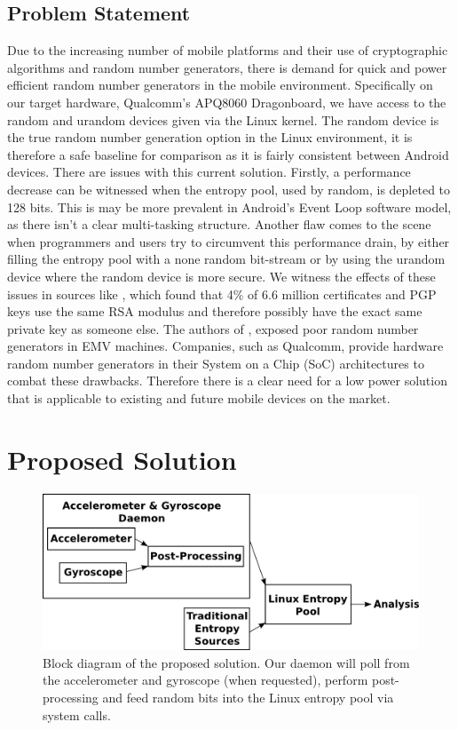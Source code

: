 \documentclass[conference]{IEEEtran}
\begin{document}
\subsection{Problem Statement}
Due to the increasing number of mobile platforms and their use of cryptographic algorithms and random number generators, there is demand for quick 
and power efficient random number generators in the mobile environment. Specifically on our target hardware, Qualcomm's APQ8060 Dragonboard, we have 
access to the random and urandom devices given via the Linux kernel. The random device is the true random number generation option in the Linux 
environment, it is therefore a safe baseline for comparison as it is fairly consistent between Android devices. There are issues with this current solution.
Firstly, a performance decrease can be witnessed when the entropy pool, used by random, is depleted to 128 bits. This is may be more prevalent in Android's
Event Loop software model, as there isn't a clear multi-tasking structure. Another flaw comes to the scene when programmers and users try to circumvent
this performance drain, by either filling the entropy pool with a none random bit-stream or by using the urandom device where the random device is more secure.
We witness the effects of these issues in sources like \cite{ron_was_wrong}, which found that 4\% of 6.6 million certificates and PGP keys use the same RSA 
modulus and therefore possibly have the exact same private key as someone else. The authors of \cite{chip_and_skim}, exposed poor random number generators
in EMV machines. Companies, such as Qualcomm, provide hardware random number generators in their System on a Chip (SoC) architectures to combat these drawbacks. 
Therefore there is a clear need for a low power solution that is applicable to existing and future mobile devices on the market.


\section{Proposed Solution}
\begin{figure}[t]
	\includegraphics[width=\columnwidth]{proposed_solution}
	\caption{Block diagram of the proposed solution.  Our daemon will poll from the accelerometer and gyroscope (when requested), perform post-processing and feed random bits into the Linux entropy pool via system calls.}
	\label{proposed_solution_block}
\end{figure}
\end{document}
